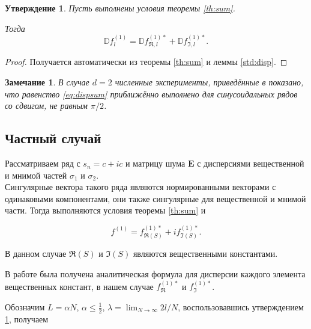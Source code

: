 \documentclass[specialist,
               substylefile = spbu.rtx,
               subf,href,colorlinks=true, 12pt]{disser}
\newtheorem{statement}{Утверждение}
\newtheorem*{notice*}{Замечание}
\begin{document}
\begin{statement} \label{st:dispsum}
	Пусть выполнены условия теоремы \ref{th:sum}.
	
	Тогда
	\begin{equation} \label{eq:dispsum}
	\mathbb{D}f^{(1)}_l = \mathbb{D}f^{(1)*}_{\Re, l} + \mathbb{D}f^{(1)*}_{\Im, l}.	
	\end{equation}
\end{statement}
\begin{proof}
	Получается автоматически из теоремы \ref{th:sum} и леммы \ref{std:disp}.
\end{proof}

\begin{notice*}
	В случае $d = 2$  численные эксперименты, приведённые в \cite[раздел 4.3.3.3]{Golyandina.etal2018} показано, что равенство \eqref{eq:dispsum} приближённо выполнено для синусоидальных рядов со сдвигом, не равным $\pi / 2$.
\end{notice*}

\subsection{Частный случай}
Рассматриваем ряд с $s_n = c + ic$ и матрицу шума $\mathbf{E}$ с дисперсиями вещественной и мнимой частей $\sigma_1$ и $\sigma_2$.\\
Сингулярные вектора такого ряда являются нормированными векторами с одинаковыми компонентами, они также сингулярные для вещественной и мнимой части. Тогда выполняются условия теоремы \ref{th:sum} и

$$f^{(1)} = f^{(1)*}_{\Re(S)} + if^{(1)*}_{\Im(S)}.$$

В данном случае $\Re(S)$ и $\Im(S)$ являются вещественными константами.

В работе \cite{Vlas2008} была получена аналитическая формула для дисперсии каждого элемента вещественных констант, в нашем случае $f^{(1)*}_{\Re}$ и $f^{(1)*}_{\Im}$.

Обозначим $L = \alpha N$, $\alpha \leq \frac{1}{2}$, $\lambda = \lim_{N\to\infty} 2 l / N$, воспользовавшись утверждением \ref{st:dispsum}, получаем
\end{document}
